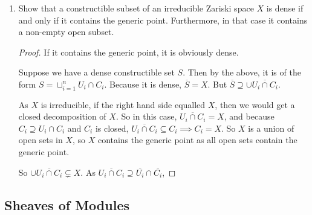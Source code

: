 \begin{exercise}
\begin{enumerate}
\begin{proof}
            (3): Suppose we have $X = \sqcup_{i=1}^n U_i\cap C_i$.
            Then $X^C = \cap_{i=1}^n (U_i\cap C_i)^C = \cap_{i=1}^n U_i^C\cup C_i^C$.
            As $U_i^C,C_i^C$ are locally closed, $U_i^C\cup C_i^C \in S$ by definition.
            By (2), this intersection is in $S$.
            So $S$ is closed under complements.
        \end{proof}
        \item Show that a constructible subset of an irreducible Zariski space $X$ is dense if and only if it contains the generic point. Furthermore, in that case it contains a non-empty open subset.
        \begin{proof}
            If it contains the generic point, it is obviously dense.

            Suppose we have a dense constructible set $S$.
            Then by the above, it is of the form $S = \sqcup_{i=1}^n U_i\cap C_i$.
            Because it is dense, $\overline{S} = X$.
            But $\overline{S} \supseteq \cup \overline{U_i\cap C_i}$.
            
            As $X$ is irreducible, if the right hand side equalled $X$, then we would get a closed decomposition of $X$.
            So in this case, $\overline{U_i\cap C_i} = X$, and because $C_i \supseteq U_i\cap C_i$ and $C_i$ is closed, $\overline{U_i\cap C_i} \subseteq C_i \implies C_i = X$.
            So $X$ is a union of open sets in $X$, so $X$ contains the generic point as all open sets contain the generic point.

            So $\cup \overline{U_i\cap C_i} \subsetneq X$.
            As $\overline{U_i\cap C_i} \supseteq \overline{U_i}\cap \overline{C_i}$, 
        \end{proof}
    \end{enumerate}
\end{exercise}

\subsection{Sheaves of Modules}

